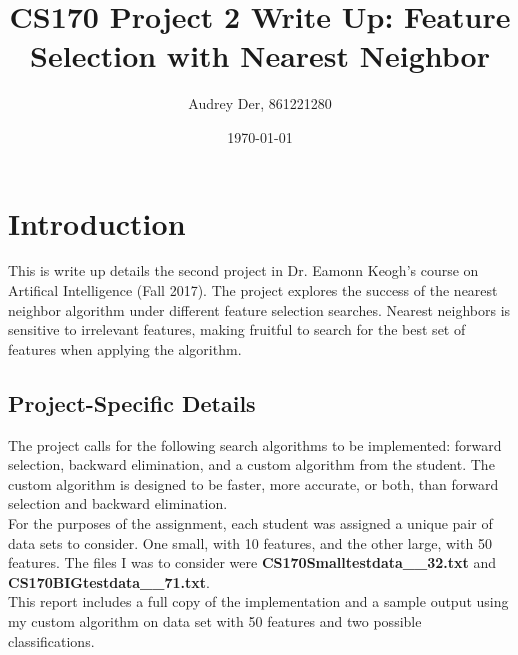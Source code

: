 \documentclass{article}
\begin{document}






\title{CS170 Project 2 Write Up: Feature Selection with Nearest Neighbor}
\author{Audrey Der, 861221280}
\date{\today}
\maketitle

\section{Introduction}
This is write up details the second project in Dr. Eamonn Keogh's course on Artifical
Intelligence (Fall 2017). The project explores the success of the nearest neighbor
algorithm under different feature selection searches. Nearest neighbors
is sensitive to irrelevant features, making fruitful to search for
the best set of features when applying the algorithm.

\subsection{Project-Specific Details}
The project calls for the following search algorithms to be implemented: forward selection, backward
elimination, and a custom algorithm from the student. The custom algorithm is
designed to be faster, more accurate, or both, than forward selection and
backward elimination. \\

For the purposes of the assignment, each student was assigned a unique pair of data
sets to consider. One small, with 10 features, and the other large, with 50
features. The files I was to consider were \textbf{CS170Smalltestdata\_\_32.txt}
and \textbf{CS170BIGtestdata\_\_71.txt}. \\

This report includes a full copy of the implementation and a sample output using
my custom algorithm on data set with 50 features and two possible classifications.
\end{document}
